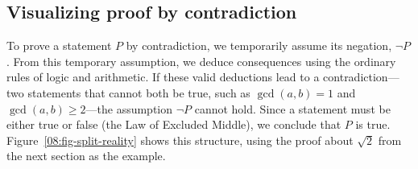 \subsection{Visualizing proof by contradiction}

To prove a statement $P$ by contradiction, we temporarily assume its negation, $\neg P$. From this temporary assumption, we deduce consequences using the ordinary rules of logic and arithmetic. If these valid deductions lead to a contradiction---two statements that cannot both be true, such as $\gcd(a, b) = 1$ and $\gcd(a, b) \ge 2$---the assumption $\neg P$ cannot hold. Since a statement must be either true or false (the Law of Excluded Middle), we conclude that $P$ is true. Figure~\ref{08:fig-split-reality} shows this structure, using the proof about $\sqrt{2}$ from the next section as the example.

